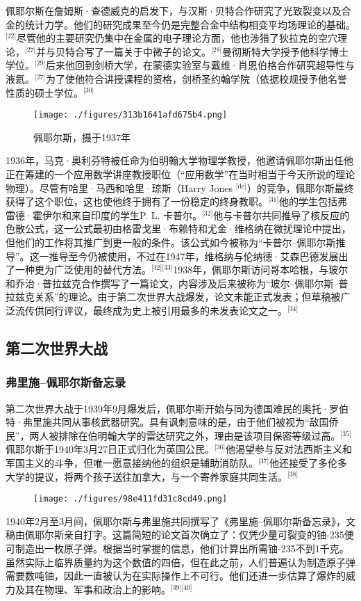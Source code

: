 佩耶尔斯在詹姆斯·查德威克的启发下，与汉斯·贝特合作研究了光致裂变以及合金的统计力学。他们的研究成果至今仍是完整合金中结构相变平均场理论的基础。\(^\text{[22]}\)尽管他的主要研究仍集中在金属的电子理论方面，他也涉猎了狄拉克的空穴理论，\(^\text{[27]}\)并与贝特合写了一篇关于中微子的论文。\(^\text{[28]}\)曼彻斯特大学授予他科学博士学位。\(^\text{[29]}\)后来他回到剑桥大学，在蒙德实验室与戴维·肖恩伯格合作研究超导性与液氦。\(^\text{[27]}\)为了使他符合讲授课程的资格，剑桥圣约翰学院（依据校规授予他名誉性质的硕士学位。\(^\text{[30]}\)
\begin{figure}[ht]
\centering
\texttt{[image: ./figures/313b1641afd675b4.png]}
\caption{佩耶尔斯，摄于1937年} \label{fig_LDF_3}
\end{figure}
1936年，马克·奥利芬特被任命为伯明翰大学物理学教授，他邀请佩耶尔斯出任他正在筹建的一个应用数学讲座教授职位（“应用数学”在当时相当于今天所说的理论物理）。尽管有哈里·马西和哈里·琼斯（Harry Jones \(^\text{[de]}\)）的竞争，佩耶尔斯最终获得了这个职位，这也使他终于拥有了一份稳定的终身教职。\(^\text{[31]}\)他的学生包括弗雷德·霍伊尔和来自印度的学生P. L. 卡普尔。\(^\text{[32]}\)他与卡普尔共同推导了核反应的色散公式，这一公式最初由格雷戈里·布赖特和尤金·维格纳在微扰理论中提出，但他们的工作将其推广到更一般的条件。该公式如今被称为“卡普尔–佩耶尔斯推导”。这一推导至今仍被使用，不过在1947年，维格纳与伦纳德·艾森巴德发展出了一种更为广泛使用的替代方法。\(^\text{[32][33]}\)1938年，佩耶尔斯访问哥本哈根，与玻尔和乔治·普拉兹克合作撰写了一篇论文，内容涉及后来被称为“玻尔–佩耶尔斯–普拉兹克关系”的理论。由于第二次世界大战爆发，论文未能正式发表；但草稿被广泛流传供同行评议，最终成为史上被引用最多的未发表论文之一。\(^\text{[34]}\)
\subsection{第二次世界大战}
\subsubsection{弗里施–佩耶尔斯备忘录}
第二次世界大战于1939年9月爆发后，佩耶尔斯开始与同为德国难民的奥托·罗伯特·弗里施共同从事核武器研究。具有讽刺意味的是，由于他们被视为“敌国侨民”，两人被排除在伯明翰大学的雷达研究之外，理由是该项目保密等级过高。\(^\text{[35]}\)佩耶尔斯于1940年3月27日正式归化为英国公民。\(^\text{[36]}\)他渴望参与反对法西斯主义和军国主义的斗争，但唯一愿意接纳他的组织是辅助消防队。\(^\text{[37]}\)他还接受了多伦多大学的提议，将两个孩子送往加拿大，与一个寄养家庭共同生活。\(^\text{[38]}\)
\begin{figure}[ht]
\centering
\texttt{[image: ./figures/98e411fd31c8cd49.png]}
\caption{} \label{fig_LDF_4}
\end{figure}
1940年2月至3月间，佩耶尔斯与弗里施共同撰写了《弗里施–佩耶尔斯备忘录》，文稿由佩耶尔斯亲自打字。这篇简短的论文首次确立了：仅凭少量可裂变的铀-235便可制造出一枚原子弹。根据当时掌握的信息，他们计算出所需铀-235不到1千克。虽然实际上临界质量约为这个数值的四倍，但在此之前，人们普遍认为制造原子弹需要数吨铀，因此一直被认为在实际操作上不可行。他们还进一步估算了爆炸的威力及其在物理、军事和政治上的影响。\(^\text{[39][40]}\)

